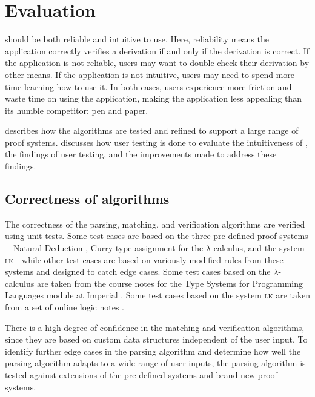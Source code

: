 \chapter{Evaluation}
\projectname{} should be both reliable and intuitive to use. Here, reliability means the application correctly verifies a derivation if and only if the derivation is correct. If the application is not reliable, users may want to double-check their derivation by other means. If the application is not intuitive, users may need to spend more time learning how to use it. In both cases, users experience more friction and waste time on using the application, making the application less appealing than its humble competitor: pen and paper.

 describes how the algorithms are tested and refined to support a large range of proof systems.  discusses how user testing is done to evaluate the intuitiveness of \projectname{}, the findings of user testing, and the improvements made to address these findings.

\section{Correctness of algorithms}
\label{evaluation:correctness}
The correctness of the parsing, matching, and verification algorithms are verified using unit tests. Some test cases are based on the three pre-defined proof systems---Natural Deduction \ndt{}, Curry type assignment for the $\lambda$-calculus, and the system \textsc{lk}---while other test cases are based on variously modified rules from these systems and designed to catch edge cases. Some test cases based on the $\lambda$-calculus are taken from the course notes for the Type Systems for Programming Languages module at Imperial \cite{van-bakel:2022}. Some test cases based on the system \textsc{lk} are taken from a set of online logic notes \cite{sequent}.

There is a high degree of confidence in the matching and verification algorithms, since they are based on custom data structures independent of the user input. To identify further edge cases in the parsing algorithm and determine how well the parsing algorithm adapts to a wide range of user inputs, the parsing algorithm is tested against extensions of the pre-defined systems and brand new proof systems.

